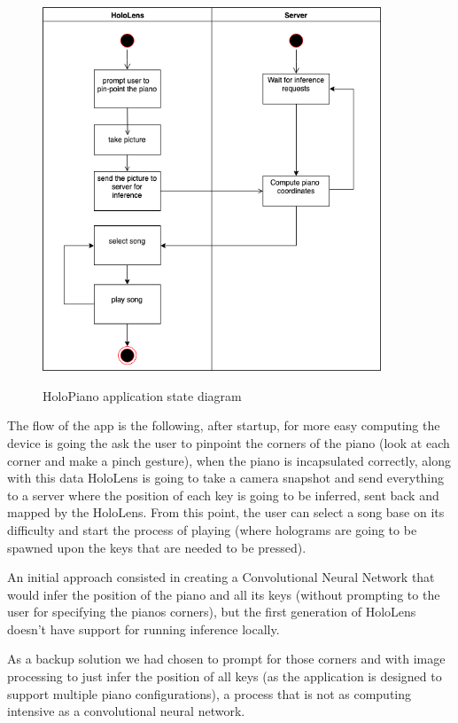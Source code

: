 \documentclass[12 pct]{report}
\begin{document}
\begin{figure}[H]
\includegraphics[width=0.9\textwidth]{HoloPianoStateDiagram}
\centering
\label{fig:feature-points}
\caption{HoloPiano application state diagram}
\end{figure}

The flow of the app is the following, after startup, for more easy computing the device is going the ask the user to pinpoint the corners of the piano (look at each corner and make a pinch gesture), when the piano is incapsulated correctly, along with this data HoloLens is going to take a camera snapshot and send everything to a server where the position of each key is going to be inferred, sent back and mapped by the HoloLens. From this point, the user can select a song base on its difficulty and start the process of playing (where holograms are going to be spawned upon the keys that are needed to be pressed).

An initial approach consisted in creating a Convolutional Neural Network that would infer the position of the piano and all its keys (without prompting to the user for specifying the pianos corners), but the first generation of HoloLens doesn't have support for running inference locally.

As a backup solution we had chosen to prompt for those corners and with image processing to just infer the position of all keys (as the application is designed to support multiple piano configurations), a process that is not as computing intensive as a convolutional neural network.
\end{document}
